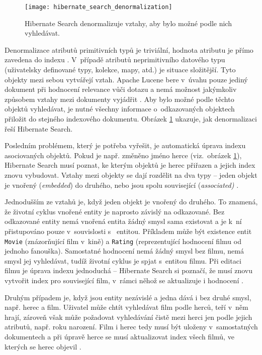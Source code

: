\documentclass[11pt,oneside]{fithesis2}
\begin{document}
\begin{figure}[h!]
	\begin{center}
		\texttt{[image: hibernate\_search\_denormalization]}
	\end{center}
	\caption{Hibernate Search denormalizuje vztahy, aby bylo možné podle nich vyhledávat.}	
	\label{HibernateSearchDenormalizationExample}
\end{figure}

Denormalizace atributů primitivních typů je triviální, hodnota atributu je přímo zavedena do indexu \cite[str. 76]{HibernateSearchAction}. V~případě atributů neprimitivního datového typu (uživatelsky definované typy, kolekce, mapy, atd.) je situace složitější. Tyto objekty mezi sebou vytvářejí vztah. Apache Lucene bere v~úvahu pouze jediný dokument při hodnocení relevance vůči dotazu a nemá možnost jakýmkoliv způsobem vztahy mezi dokumenty vyjádřit \cite[str. 105]{HibernateSearchAction}. Aby bylo možné podle těchto objektů vyhledávat, je nutné všechny informace o~odkazovaných objektech přiložit do stejného indexového dokumentu. Obrázek \ref{HibernateSearchDenormalizationExample} ukazuje, jak denormalizaci řeší Hibernate Search.

Posledním problémem, který je potřeba vyřešit, je automatická úprava indexu asociovaných objektů. Pokud je např. změněno jméno herce (viz.~obrázek \ref{HibernateSearchDenormalizationExample}), Hibernate Search musí poznat, ke kterým objektů je herec přiřazen a jejich index znovu vybudovat. Vztahy mezi objekty se dají rozdělit na dva typy -- jeden objekt je vnořený (\emph{embedded}) do druhého, nebo jsou spolu související (\emph{associated)} \cite[str. 107, 110]{HibernateSearchAction}. 

Jednodušším ze vztahů je, když jeden objekt je vnořený do druhého. To znamená, že životní cyklus vnořené entity je naprosto závislý na odkazované. Bez odkazované entity nemá vnořená entita žádný smysl sama existovat a je k~ní přistupováno pouze v~souvislosti s~ entitou. Příkladem může být existence entit \texttt{Movie} (znázorňující film v~kině) a \texttt{Rating} (reprezentující hodnocení filmu od jednoho fanouška). Samostatné hodnocení nemá žádný smysl bez filmu, nemá smysl jej vyhledávat, tudíž životní cyklus je spjat s~entitou filmu. Při editaci filmu je úprava indexu jednoduchá -- Hibernate Search si poznačí, že musí znovu vytvořit index pro související film, v~rámci něhož se aktualizuje i hodnocení \cite[str. 108]{HibernateSearchAction}.

Druhým případem je, když jsou entity nezávislé a jedna dává i bez druhé smysl, např. herec a film. Uživatel může chtít vyhledávat film podle herců, teří v~něm hrají, zároveň však může požadovat vyhledávání čistě mezi herci jen podle jejich atributů, např. roku narození. Film i herec tedy musí být uloženy v~samostatných dokumentech a při úpravě herce se musí aktualizovat index všech filmů, ve kterých se herec objevil \cite[str. 110]{HibernateSearchAction}. 
\end{document}
